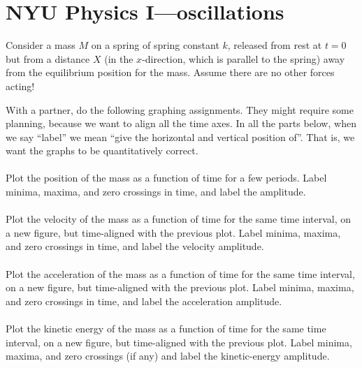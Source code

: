 \documentclass[12pt]{article}
\begin{document}
\section*{NYU Physics I---oscillations}

Consider a mass $M$ on a spring of spring constant $k$, released from
rest at $t=0$ but from a distance $X$ (in the $x$-direction, which is
parallel to the spring) away from the equilibrium position for the
mass.  Assume there are no other forces acting!

With a partner, do the following graphing assignments. They might
require some planning, because we want to align all the time axes.  In
all the parts below, when we say ``label'' we mean ``give the
horizontal and vertical position of''. That is, we want the graphs to
be quantitatively correct.

\paragraph{\theproblem}%
Plot the position of the mass as a function of time for a few periods.
Label minima, maxima, and zero crossings in time, and label the amplitude.

\paragraph{\theproblem}%
Plot the velocity of the mass as a function of time for the same time
interval, on a new figure, but time-aligned with the previous plot.  Label
minima, maxima, and zero crossings in time, and label the velocity amplitude.

\paragraph{\theproblem}%
Plot the acceleration of the mass as a function of time for the same time
interval, on a new figure, but time-aligned with the previous plot.  Label
minima, maxima, and zero crossings in time, and label the acceleration amplitude.

\paragraph{\theproblem}%
Plot the kinetic energy of the mass as a function of time for the same time
interval, on a new figure, but time-aligned with the previous plot.  Label
minima, maxima, and zero crossings (if any) and label the kinetic-energy amplitude.
\end{document}
